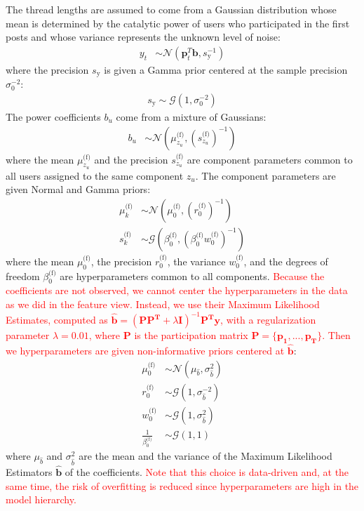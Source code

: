 \documentclass[smallextended]{svjour3}          %
\newcommand\alberto[1]{\textcolor{red}{#1}}
\newcommand{\muo}{\mu_{0}^\text{(f)}}
\newcommand{\ro}{r_{0}^\text{(f)}}
\newcommand{\invro}{\left(r_{0}^\text{(f)}\right)^{-1}}
\newcommand{\wo}{w_{0}^\text{(f)}}
\newcommand{\betaof}{\beta_{0}^\text{(f)}}
\newcommand{\muk}{\mu_{k}^\text{(f)}}
\newcommand{\sk}{s_{k}^\text{(f)}}
\newcommand{\szu}{s_{z_u}^\text{(f)}}
\newcommand{\invszu}{\left(s_{z_u}^{\text{(f)}}\right)^{-1}}
\newcommand{\muzu}{\mu_{z_u}^\text{(f)}}
\begin{document}
The thread lengths are assumed to come from a Gaussian distribution whose mean is determined by the catalytic power of users who participated in the first posts and whose variance represents the unknown level of noise:
\begin{align}
y_t &\sim \mathcal{N}(\mathbf{p}_t^T \mathbf{b}, s_{\text{y}}^{-1})
\end{align}
where the precision $s_{\text{y}}$ is given a Gamma prior centered at the sample precision $\sigma_0^{-2}$:
\begin{align}
s_{\text{y}} \sim \mathcal{G}(1,\sigma_{\text{0}}^{-2})
\end{align}
The power coefficients $b_u$ come from a mixture of Gaussians:
\begin{align}
b_u &\sim \mathcal{N}\left(\muzu, \invszu\right)
\end{align}
where the mean $\muzu$ and the precision $\szu$ are component parameters common to all users assigned to the same component $z_u$. The component parameters are given Normal and Gamma priors:
\begin{align}
\muk &\sim  \mathcal{N}\left(\muo, \invro \right)\\
\sk &\sim  \mathcal{G}\left( \betaof, \left(\betaof\wo\right)^{-1}\right) 
\end{align}
where the mean $\muo$, the precision $\ro$, the variance $\wo$, and the degrees of freedom $\betaof$ are hyperparameters common to all components. \alberto{Because the coefficients are not observed, we cannot center the hyperparameters in the data as we did in the feature view. Instead, we use their Maximum Likelihood Estimates, computed as $\mathbf{\mathbf{\hat{b}}} = (\mathbf{P}\mathbf{P^T} + \lambda\mathbf{I})^{-1} \mathbf{P^T y}$, with a regularization parameter $\lambda=0.01$, where $\mathbf{P}$ is the participation matrix $\mathbf{P} = \{\mathbf{p_1},...,\mathbf{p_T}\}$. Then we hyperparameters are given non-informative priors centered at $\mathbf{\hat{b}}$}:
\begin{align}
\muo &\sim \mathcal{N}(\mu_{\hat{b}}, \sigma_{\hat{b}}^2) \\
\ro &\sim \mathcal{G}(1, \sigma_{\hat{b}}^{-2})\\
\wo  &\sim \mathcal{G}(1, \sigma_{\hat{b}}^{2})\\
\frac{1}{\betaof}&\sim \mathcal{G}(1, 1)
\end{align}
where $\mu_{\hat{b}}$ and $\sigma_{\hat{b}}^2$ are the mean and the variance of the Maximum Likelihood Estimators $\mathbf{\hat{b}}$ of the coefficients. \alberto{Note that this choice is data-driven and, at the same time, the risk of overfitting is reduced since hyperparameters are high in the model hierarchy.}
\end{document}
